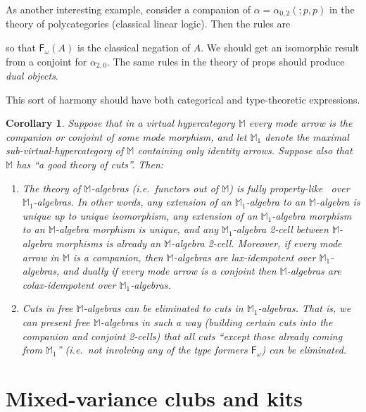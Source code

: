 \documentclass{article}
\newtheorem{conj}[thm]{Corollary}
\theoremstyle{definition}
\theoremstyle{remark}
\def\M{\mathbb{M}}
\def\form#1{\mathsf{F}_{#1}}
\let\types\vdash
\begin{document}
As another interesting example, consider a companion of $\alpha = \alpha_{0,2}(;p,p)$ in the theory of polycategories (classical linear logic).
Then the rules are
so that $\form\omega(A)$ is the classical negation of $A$.
We should get an isomorphic result from a conjoint for $\alpha_{2,0}$.
The same rules in the theory of props should produce \emph{dual objects}.

This sort of harmony should have both categorical and type-theoretic expressions.

\begin{conj}
  Suppose that in a virtual hypercategory $\M$ every mode arrow is the companion or conjoint of some mode morphism, and let $\M_1$ denote the maximal sub-virtual-hypercategory of $\M$ containing only identity arrows.
  Suppose also that $\M$ has ``a good theory of cuts''.
  Then:
  \begin{enumerate}
  \item The theory of $\M$-algebras (i.e.\ functors out of $\M$) is fully property-like~\cite{kl:property-like} over $\M_1$-algebras.
    In other words, any extension of an $\M_1$-algebra to an $\M$-algebra is unique up to unique isomorphism, any extension of an $\M_1$-algebra morphism to an $\M$-algebra morphism is unique, and any $\M_1$-algebra 2-cell between $\M$-algebra morphisms is already an $\M$-algebra 2-cell.
    Moreover, if every mode arrow in $\M$ is a companion, then $\M$-algebras are lax-idempotent over $\M_1$-algebras, and dually if every mode arrow is a conjoint then $\M$-algebras are colax-idempotent over $\M_1$-algebras.
  \item Cuts in free $\M$-algebras can be eliminated to cuts in $\M_1$-algebras.
    That is, we can present free $\M$-algebras in such a way (building certain cuts into the companion and conjoint 2-cells) that all cuts ``except those already coming from $\M_1$'' (i.e.\ not involving any of the type formers $\form\omega$) can be eliminated.
  \end{enumerate}
\end{conj}


\section{Mixed-variance clubs and kits}
\label{sec:kits}
\end{document}
